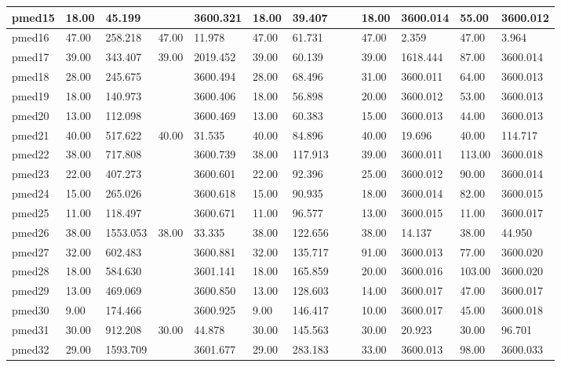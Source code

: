 \begin{landscape}
\begin{table}[t]
{\begin{tabular}{|l|l|l|l|l|l|l|l|l|l|l|l|l|}
pmed15 & 18.00 & 45.199 & & 3600.321 & 18.00 & 39.407 & & & 18.00 & 3600.014 & 55.00 & 3600.012 \\ \hline
pmed16 & 47.00 & 258.218 & 47.00 & 11.978 & 47.00 & 61.731 & & & 47.00 & 2.359 & 47.00 & 3.964 \\ \hline
pmed17 & 39.00 & 343.407 & 39.00 & 2019.452 & 39.00 & 60.139 & & & 39.00 & 1618.444 & 87.00 & 3600.014 \\ \hline
pmed18 & 28.00 & 245.675 & & 3600.494 & 28.00 & 68.496 & & & 31.00 & 3600.011 & 64.00 & 3600.013 \\ \hline
pmed19 & 18.00 & 140.973 & & 3600.406 & 18.00 & 56.898 & & & 20.00 & 3600.012 & 53.00 & 3600.013 \\ \hline
pmed20 & 13.00 & 112.098 & & 3600.469 & 13.00 & 60.383 & & & 15.00 & 3600.013 & 44.00 & 3600.013 \\ \hline
pmed21 & 40.00 & 517.622 & 40.00 & 31.535 & 40.00 & 84.896 & & & 40.00 & 19.696 & 40.00 & 114.717 \\ \hline
pmed22 & 38.00 & 717.808 & & 3600.739 & 38.00 & 117.913 & & & 39.00 & 3600.011 & 113.00 & 3600.018 \\ \hline
pmed23 & 22.00 & 407.273 & & 3600.601 & 22.00 & 92.396 & & & 25.00 & 3600.012 & 90.00 & 3600.014 \\ \hline
pmed24 & 15.00 & 265.026 & & 3600.618 & 15.00 & 90.935 & & & 18.00 & 3600.014 & 82.00 & 3600.015 \\ \hline
pmed25 & 11.00 & 118.497 & & 3600.671 & 11.00 & 96.577 & & & 13.00 & 3600.015 & 11.00 & 3600.017 \\ \hline
pmed26 & 38.00 & 1553.053 & 38.00 & 33.335 & 38.00 & 122.656 & & & 38.00 & 14.137 & 38.00 & 44.950 \\ \hline
pmed27 & 32.00 & 602.483 & & 3600.881 & 32.00 & 135.717 & & & 91.00 & 3600.013 & 77.00 & 3600.020 \\ \hline
pmed28 & 18.00 & 584.630 & & 3601.141 & 18.00 & 165.859 & & & 20.00 & 3600.016 & 103.00 & 3600.020 \\ \hline
pmed29 & 13.00 & 469.069 & & 3600.850 & 13.00 & 128.603 & & & 14.00 & 3600.017 & 47.00 & 3600.017 \\ \hline
pmed30 & 9.00 & 174.466 & & 3600.925 & 9.00 & 146.417 & & & 10.00 & 3600.017 & 45.00 & 3600.018 \\ \hline
pmed31 & 30.00 & 912.208 & 30.00 & 44.878 & 30.00 & 145.563 & & & 30.00 & 20.923 & 30.00 & 96.701 \\ \hline
pmed32 & 29.00 & 1593.709 & & 3601.677 & 29.00 & 283.183 & & & 33.00 & 3600.013 & 98.00 & 3600.033 \\ \hline

\end{tabular}}
\end{table}
\end{landscape}
